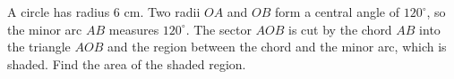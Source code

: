 A circle has radius $6$ cm. Two radii $OA$ and $OB$ form a central angle of $120^\circ$, so the minor arc $AB$ measures $120^\circ$. The sector $AOB$ is cut by the chord $AB$ into the triangle $AOB$ and the region between the chord and the minor arc, which is shaded. Find the area of the shaded region.
